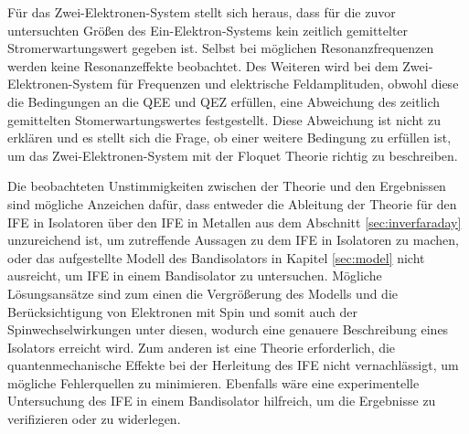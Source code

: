 Für das Zwei-Elektronen-System stellt sich heraus,
dass für die zuvor untersuchten
Größen des Ein-Elektron-Systems
kein zeitlich gemittelter
Stromerwartungswert gegeben ist.
Selbst bei möglichen Resonanzfrequenzen werden
keine Resonanzeffekte beobachtet.
Des Weiteren wird bei dem  Zwei-Elektronen-System
für Frequenzen und elektrische Feldamplituden, obwohl diese die Bedingungen an die QEE und QEZ erfüllen, eine Abweichung
des zeitlich gemittelten Stomerwartungswertes festgestellt.
Diese Abweichung ist nicht zu erklären und es stellt sich die Frage, ob einer weitere Bedingung zu
erfüllen ist, um das Zwei-Elektronen-System mit der Floquet Theorie richtig zu beschreiben.


Die beobachteten Unstimmigkeiten zwischen der Theorie und den Ergebnissen
sind mögliche Anzeichen dafür, dass
entweder die
Ableitung der Theorie für den IFE in Isolatoren
über den IFE in Metallen aus dem Abschnitt \ref{sec:inverfaraday}
unzureichend ist, um zutreffende Aussagen zu dem IFE in Isolatoren zu machen, oder
das aufgestellte Modell des Bandisolators in Kapitel \ref{sec:model} nicht ausreicht,
um IFE in einem Bandisolator zu untersuchen.
Mögliche Lösungsansätze sind zum einen die Vergrößerung des Modells und die Berücksichtigung von
Elektronen mit Spin und somit auch der Spinwechselwirkungen unter diesen, wodurch eine
genauere Beschreibung eines Isolators erreicht wird.
Zum anderen ist eine Theorie erforderlich, die quantenmechanische Effekte bei der
Herleitung des IFE nicht vernachlässigt, um mögliche Fehlerquellen zu minimieren.
Ebenfalls wäre eine experimentelle Untersuchung des IFE in einem Bandisolator hilfreich,
um die Ergebnisse zu verifizieren oder zu widerlegen.

